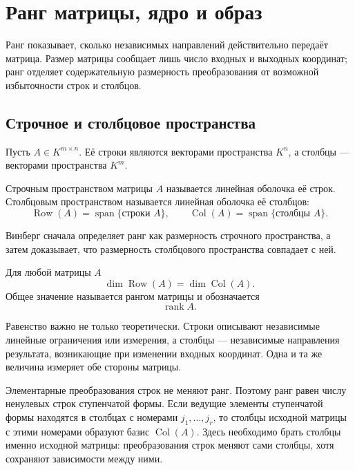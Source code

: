 \section{Ранг матрицы, ядро и образ}
\label{sec:rank-kernel-image}

Ранг показывает, сколько независимых направлений действительно передаёт матрица. Размер матрицы сообщает лишь число входных и выходных координат; ранг отделяет содержательную размерность преобразования от возможной избыточности строк и столбцов.

\subsection{Строчное и столбцовое пространства}

Пусть \(A\in K^{m\times n}\). Её строки являются векторами пространства \(K^n\), а столбцы --- векторами пространства \(K^m\).

\begin{definition}
Строчным пространством матрицы \(A\) называется линейная оболочка её строк. Столбцовым пространством называется линейная оболочка её столбцов:
\[
\operatorname{Row}(A)=\operatorname{span}\{\text{строки }A\},
\qquad
\operatorname{Col}(A)=\operatorname{span}\{\text{столбцы }A\}.
\]
\end{definition}

Винберг сначала определяет ранг как размерность строчного пространства, а затем доказывает, что размерность столбцового пространства совпадает с ней.

\begin{theorem}
Для любой матрицы \(A\)
\[
\dim \operatorname{Row}(A)
=
\dim \operatorname{Col}(A).
\]
Общее значение называется рангом матрицы и обозначается
\[
\operatorname{rank}A.
\]
\end{theorem}

Равенство важно не только теоретически. Строки описывают независимые линейные ограничения или измерения, а столбцы --- независимые направления результата, возникающие при изменении входных координат. Одна и та же величина измеряет обе стороны матрицы.

Элементарные преобразования строк не меняют ранг. Поэтому ранг равен числу ненулевых строк ступенчатой формы. Если ведущие элементы ступенчатой формы находятся в столбцах с номерами \(j_1,\dots,j_r\), то столбцы исходной матрицы с этими номерами образуют базис \(\operatorname{Col}(A)\). Здесь необходимо брать столбцы именно исходной матрицы: преобразования строк меняют сами столбцы, хотя сохраняют зависимости между ними.

